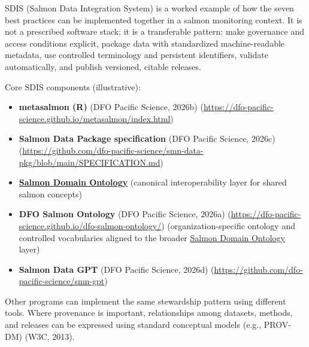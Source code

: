 \documentclass[
  letterpaper,
  DIV=11,
  numbers=noendperiod]{scrartcl}
\providecommand{\tightlist}{%
  \setlength{\itemsep}{0pt}\setlength{\parskip}{0pt}}
\begin{document}
\begin{tcolorbox}[enhanced jigsaw, opacitybacktitle=0.6, left=2mm, coltitle=black, opacityback=0, colbacktitle=quarto-callout-note-color!10!white, titlerule=0mm, colback=white, leftrule=.75mm, toprule=.15mm, bottomtitle=1mm, toptitle=1mm, title=\textcolor{quarto-callout-note-color}{\faInfo}\hspace{0.5em}{Box: Salmon Data Integration System (SDIS) --- a worked example}, rightrule=.15mm, breakable, colframe=quarto-callout-note-color-frame, arc=.35mm, bottomrule=.15mm]

SDIS (Salmon Data Integration System) is a worked example of how the
seven best practices can be implemented together in a salmon monitoring
context. It is not a prescribed software stack; it is a transferable
pattern: make governance and access conditions explicit, package data
with standardized machine-readable metadata, use controlled terminology
and persistent identifiers, validate automatically, and publish
versioned, citable releases.

Core SDIS components (illustrative):

\begin{itemize}
\tightlist
\item
  \textbf{metasalmon (R)} (DFO Pacific Science, 2026b)
  (\url{https://dfo-pacific-science.github.io/metasalmon/index.html})
\item
  \textbf{Salmon Data Package specification} (DFO Pacific Science,
  2026c)
  (\url{https://github.com/dfo-pacific-science/smn-data-pkg/blob/main/SPECIFICATION.md})
\item
  \textbf{\href{https://github.com/salmon-data-mobilization/salmon-domain-ontology/}{Salmon
  Domain Ontology}} (canonical interoperability layer for shared salmon
  concepts)
\item
  \textbf{DFO Salmon Ontology} (DFO Pacific Science, 2026a)
  (\url{https://dfo-pacific-science.github.io/dfo-salmon-ontology/})
  (organization-specific ontology and controlled vocabularies aligned to
  the broader
  \href{https://github.com/salmon-data-mobilization/salmon-domain-ontology/}{Salmon
  Domain Ontology} layer)
\item
  \textbf{Salmon Data GPT} (DFO Pacific Science, 2026d)
  (\url{https://github.com/dfo-pacific-science/smn-gpt})
\end{itemize}

Other programs can implement the same stewardship pattern using
different tools. Where provenance is important, relationships among
datasets, methods, and releases can be expressed using standard
conceptual models (e.g., PROV-DM) (W3C, 2013).

\end{tcolorbox}
\end{document}

